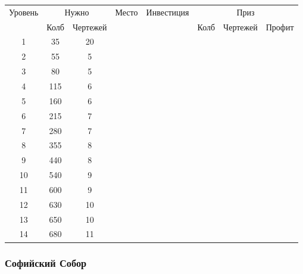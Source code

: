 \begin{longtable}[c]{|c|c|c|c|c|c|c|c|}
    \hline
    \multirow{ 2}{*}{\small Уровень} &
    \multicolumn{2}{|c|}{\small Нужно} &
    \multirow{ 2}{*}{\small Место} & 
    \multirow{ 2}{*}{\small Инвестиция} & 
    \multicolumn{3}{|c|}{\small Приз} \\\cline{2-3}\cline{6-8}
    &
    {\small Колб} & 
    {\small Чертежей} & 
    & &
    {\small Колб} & 
    {\small Чертежей} & 
    {\small Профит}
    \\\hline\endhead
    \multirow{1}{*}{1} & \multirow{1}{*}{35} & \multirow{1}{*}{20} & & & & & \\\hline
    \multirow{1}{*}{2} & \multirow{1}{*}{55} & \multirow{1}{*}{5} & & & & & \\\hline
    \multirow{1}{*}{3} & \multirow{1}{*}{80} & \multirow{1}{*}{5} & & & & & \\\hline
    \multirow{1}{*}{4} & \multirow{1}{*}{115} & \multirow{1}{*}{6} & & & & & \\\hline
    \multirow{1}{*}{5} & \multirow{1}{*}{160} & \multirow{1}{*}{6} & & & & & \\\hline
    \multirow{1}{*}{6} & \multirow{1}{*}{215} & \multirow{1}{*}{7} & & & & & \\\hline
    \multirow{1}{*}{7} & \multirow{1}{*}{280} & \multirow{1}{*}{7} & & & & & \\\hline
    \multirow{1}{*}{8} & \multirow{1}{*}{355} & \multirow{1}{*}{8} & & & & & \\\hline
    \multirow{1}{*}{9} & \multirow{1}{*}{440} & \multirow{1}{*}{8} & & & & & \\\hline
    \multirow{1}{*}{10} & \multirow{1}{*}{540} & \multirow{1}{*}{9} & & & & & \\\hline
    \multirow{1}{*}{11} & \multirow{1}{*}{600} & \multirow{1}{*}{9} & & & & & \\\hline
    \multirow{1}{*}{12} & \multirow{1}{*}{630} & \multirow{1}{*}{10} & & & & & \\\hline
    \multirow{1}{*}{13} & \multirow{1}{*}{650} & \multirow{1}{*}{10} & & & & & \\\hline
    \multirow{1}{*}{14} & \multirow{1}{*}{680} & \multirow{1}{*}{11} & & & & & \\\hline
\end{longtable}


\subsubsection{Софийский Собор}


